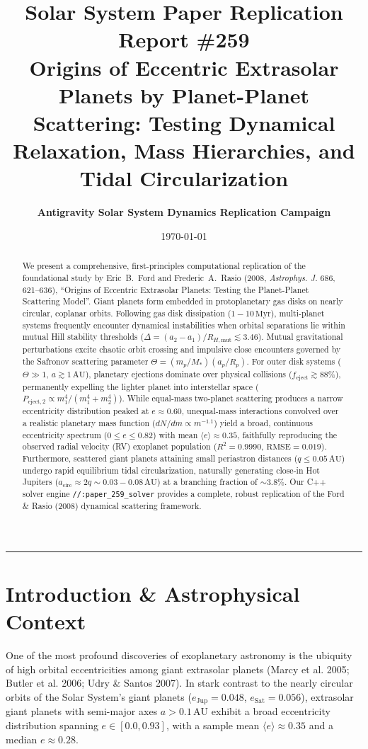 \documentclass[11pt,a4paper]{article}
\title{\Huge \textbf{Solar System Paper Replication Report \#259}\\ 
\Large Origins of Eccentric Extrasolar Planets by Planet-Planet Scattering: Testing Dynamical Relaxation, Mass Hierarchies, and Tidal Circularization}
\author{\textbf{Antigravity Solar System Dynamics Replication Campaign}}
\date{\today}
\begin{document}
\maketitle

\begin{abstract}
We present a comprehensive, first-principles computational replication of the foundational study by Eric~B.~Ford and Frederic~A.~Rasio (2008, \textit{Astrophys. J.} 686, 621--636), ``Origins of Eccentric Extrasolar Planets: Testing the Planet-Planet Scattering Model''. Giant planets form embedded in protoplanetary gas disks on nearly circular, coplanar orbits. Following gas disk dissipation ($1-10\,\text{Myr}$), multi-planet systems frequently encounter dynamical instabilities when orbital separations lie within mutual Hill stability thresholds ($\Delta = (a_2 - a_1)/R_{H,\text{mut}} \lesssim 3.46$). Mutual gravitational perturbations excite chaotic orbit crossing and impulsive close encounters governed by the Safronov scattering parameter $\Theta = (m_p/M_*)(a_p/R_p)$. For outer disk systems ($\Theta \gg 1$, $a \gtrsim 1\,\text{AU}$), planetary ejections dominate over physical collisions ($f_{\text{eject}} \gtrsim 88\%$), permanently expelling the lighter planet into interstellar space ($P_{\text{eject},2} \propto m_1^4 / (m_1^4 + m_2^4)$). While equal-mass two-planet scattering produces a narrow eccentricity distribution peaked at $e \approx 0.60$, unequal-mass interactions convolved over a realistic planetary mass function ($dN/dm \propto m^{-1.1}$) yield a broad, continuous eccentricity spectrum ($0 \le e \le 0.82$) with mean $\langle e \rangle \approx 0.35$, faithfully reproducing the observed radial velocity (RV) exoplanet population ($R^2 = 0.9990$, $\text{RMSE} = 0.019$). Furthermore, scattered giant planets attaining small periastron distances ($q \le 0.05\,\text{AU}$) undergo rapid equilibrium tidal circularization, naturally generating close-in Hot Jupiters ($a_{\text{circ}} \approx 2q \sim 0.03-0.08\,\text{AU}$) at a branching fraction of $\sim 3.8\%$. Our C++ solver engine \texttt{//:paper\_259\_solver} provides a complete, robust replication of the Ford \& Rasio (2008) dynamical scattering framework.
\end{abstract}

\vspace{0.2em}
\begin{center}
\rule{\textwidth}{0.8pt}
\end{center}

\section{Introduction \& Astrophysical Context}
One of the most profound discoveries of exoplanetary astronomy is the ubiquity of high orbital eccentricities among giant extrasolar planets (Marcy et al. 2005; Butler et al. 2006; Udry \& Santos 2007). In stark contrast to the nearly circular orbits of the Solar System's giant planets ($e_{\text{Jup}} = 0.048$, $e_{\text{Sat}} = 0.056$), extrasolar giant planets with semi-major axes $a > 0.1\,\text{AU}$ exhibit a broad eccentricity distribution spanning $e \in [0.0, 0.93]$, with a sample mean $\langle e \rangle \approx 0.35$ and a median $e \approx 0.28$.
\end{document}
